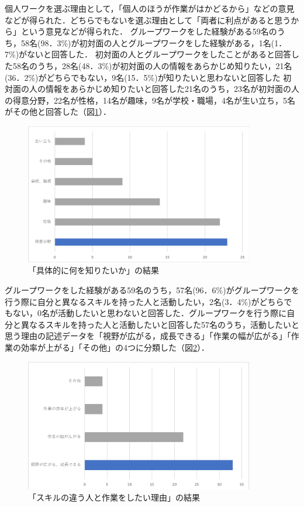 \documentclass{funthesis}
\begin{document}
個人ワークを選ぶ理由として，「個人のほうが作業がはかどるから」などの意見などが得られた．どちらでもないを選ぶ理由として「両者に利点があると思うから」という意見などが得られた．
グループワークをした経験がある59名のうち，58名(98．3\%)が初対面の人とグループワークをした経験がある，1名(1．7\%)がないと回答した．
初対面の人とグループワークをしたことがあると回答した58名のうち，28名(48．3\%)が初対面の人の情報をあらかじめ知りたい，21名(36．2\%)がどちらでもない，9名(15．5\%)が知りたいと思わないと回答した 
初対面の人の情報をあらかじめ知りたいと回答した21名のうち，23名が初対面の人の得意分野，22名が性格，14名が趣味，9名が学校・職場，4名が生い立ち，5名がその他と回答した（図\ref{graph2}）．

\begin{figure}[H]
 \centering
   \includegraphics[width=100mm]{figures/finalchart3.png}
 \caption{「具体的に何を知りたいか」の結果}
 \label{graph2}
\end{figure}

グループワークをした経験がある59名のうち，57名(96．6\%)がグループワークを行う際に自分と異なるスキルを持った人と活動したい，2名(3．4\%)がどちらでもない，0名が活動したいと思わないと回答した．グループワークを行う際に自分と異なるスキルを持った人と活動したいと回答した57名のうち，活動したいと思う理由の記述データを「視野が広がる，成長できる」「作業の幅が広がる」「作業の効率が上がる」「その他」の4つに分類した（図\ref{graph3}）．

\begin{figure}[H]
 \centering
   \includegraphics[width=100mm]{figures/finalchart2.png}
 \caption{「スキルの違う人と作業をしたい理由」の結果}
 \label{graph3}
\end{figure}
\end{document}
